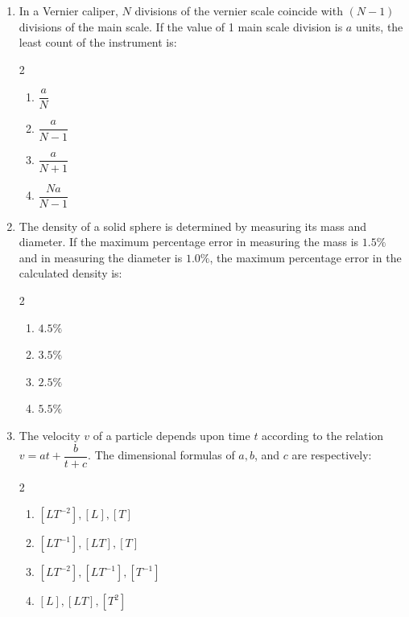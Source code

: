 \documentclass[11pt,a4paper]{article}
\begin{document}
\begin{enumerate}[label=\textbf{\textcolor{l2Amber}{Q\arabic*.}},leftmargin=24pt,itemsep=10pt,start=26]
  \item In a Vernier caliper, $N$ divisions of the vernier scale coincide with $(N - 1)$ divisions of the main scale. If the value of 1 main scale division is $a$ units, the least count of the instrument is:
  \begin{multicols}{2}
  \begin{enumerate}[label=\textbf{\textcolor{primaryDark}{(\Alph*)}},itemsep=2pt]
    \item $\dfrac{a}{N}$
    \item $\dfrac{a}{N - 1}$
    \item $\dfrac{a}{N + 1}$
    \item $\dfrac{N a}{N - 1}$
  \end{enumerate}
  \end{multicols}

  \item The density of a solid sphere is determined by measuring its mass and diameter. If the maximum percentage error in measuring the mass is $1.5\%$ and in measuring the diameter is $1.0\%$, the maximum percentage error in the calculated density is:
  \begin{multicols}{2}
  \begin{enumerate}[label=\textbf{\textcolor{primaryDark}{(\Alph*)}},itemsep=2pt]
    \item $4.5\%$
    \item $3.5\%$
    \item $2.5\%$
    \item $5.5\%$
  \end{enumerate}
  \end{multicols}

  \item The velocity $v$ of a particle depends upon time $t$ according to the relation $v = a t + \dfrac{b}{t + c}$. The dimensional formulas of $a, b$, and $c$ are respectively:
  \begin{multicols}{2}
  \begin{enumerate}[label=\textbf{\textcolor{primaryDark}{(\Alph*)}},itemsep=2pt]
    \item $[L T^{-2}], [L], [T]$
    \item $[L T^{-1}], [L T], [T]$
    \item $[L T^{-2}], [L T^{-1}], [T^{-1}]$
    \item $[L], [L T], [T^2]$
  \end{enumerate}
  \end{multicols}


\end{enumerate}
\end{document}
